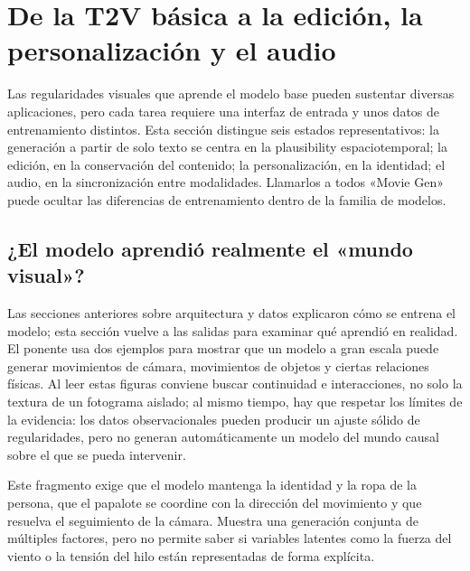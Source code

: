 \section{De la T2V básica a la edición, la personalización y el audio}

Las regularidades visuales que aprende el modelo base pueden sustentar diversas aplicaciones, pero cada tarea requiere una interfaz de entrada y unos datos de entrenamiento distintos. Esta sección distingue seis estados representativos: la generación a partir de solo texto se centra en la plausibility espaciotemporal; la edición, en la conservación del contenido; la personalización, en la identidad; el audio, en la sincronización entre modalidades. Llamarlos a todos «Movie Gen» puede ocultar las diferencias de entrenamiento dentro de la familia de modelos.

\subsection{¿El modelo aprendió realmente el «mundo visual»?}

Las secciones anteriores sobre arquitectura y datos explicaron cómo se entrena el modelo; esta sección vuelve a las salidas para examinar qué aprendió en realidad. El ponente usa dos ejemplos para mostrar que un modelo a gran escala puede generar movimientos de cámara, movimientos de objetos y ciertas relaciones físicas. Al leer estas figuras conviene buscar continuidad e interacciones, no solo la textura de un fotograma aislado; al mismo tiempo, hay que respetar los límites de la evidencia: los datos observacionales pueden producir un ajuste sólido de regularidades, pero no generan automáticamente un modelo del mundo causal sobre el que se pueda intervenir.


Este fragmento exige que el modelo mantenga la identidad y la ropa de la persona, que el papalote se coordine con la dirección del movimiento y que resuelva el seguimiento de la cámara. Muestra una generación conjunta de múltiples factores, pero no permite saber si variables latentes como la fuerza del viento o la tensión del hilo están representadas de forma explícita.


